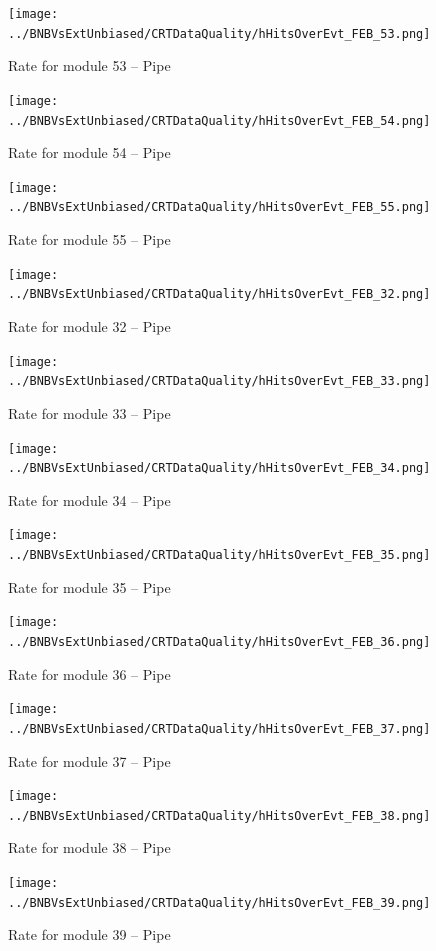 \begin{figure}[h!]
\centering
\texttt{[image: ../BNBVsExtUnbiased/CRTDataQuality/hHitsOverEvt\_FEB\_53.png]}
\caption{Rate for module 53 -- Pipe}
\label{Annual53}
\end{figure}
\begin{figure}[h!]
\centering
\texttt{[image: ../BNBVsExtUnbiased/CRTDataQuality/hHitsOverEvt\_FEB\_54.png]}
\caption{Rate for module 54 -- Pipe}
\label{Annual54}
\end{figure}
\begin{figure}[h!]
\centering
\texttt{[image: ../BNBVsExtUnbiased/CRTDataQuality/hHitsOverEvt\_FEB\_55.png]}
\caption{Rate for module 55 -- Pipe}
\label{Annual55}
\end{figure}
\begin{figure}[h!]
\centering
\texttt{[image: ../BNBVsExtUnbiased/CRTDataQuality/hHitsOverEvt\_FEB\_32.png]}
\caption{Rate for module 32 -- Pipe}
\label{Annual32}
\end{figure}
\begin{figure}[h!]
\centering
\texttt{[image: ../BNBVsExtUnbiased/CRTDataQuality/hHitsOverEvt\_FEB\_33.png]}
\caption{Rate for module 33 -- Pipe}
\label{Annual33}
\end{figure}
\begin{figure}[h!]
\centering
\texttt{[image: ../BNBVsExtUnbiased/CRTDataQuality/hHitsOverEvt\_FEB\_34.png]}
\caption{Rate for module 34 -- Pipe}
\label{Annual34}
\end{figure}
\begin{figure}[h!]
\centering
\texttt{[image: ../BNBVsExtUnbiased/CRTDataQuality/hHitsOverEvt\_FEB\_35.png]}
\caption{Rate for module 35 -- Pipe}
\label{Annual35}
\end{figure}
\begin{figure}[h!]
\centering
\texttt{[image: ../BNBVsExtUnbiased/CRTDataQuality/hHitsOverEvt\_FEB\_36.png]}
\caption{Rate for module 36 -- Pipe}
\label{Annual36}
\end{figure}
\begin{figure}[h!]
\centering
\texttt{[image: ../BNBVsExtUnbiased/CRTDataQuality/hHitsOverEvt\_FEB\_37.png]}
\caption{Rate for module 37 -- Pipe}
\label{Annual37}
\end{figure}
\begin{figure}[h!]
\centering
\texttt{[image: ../BNBVsExtUnbiased/CRTDataQuality/hHitsOverEvt\_FEB\_38.png]}
\caption{Rate for module 38 -- Pipe}
\label{Annual38}
\end{figure}
\begin{figure}[h!]
\centering
\texttt{[image: ../BNBVsExtUnbiased/CRTDataQuality/hHitsOverEvt\_FEB\_39.png]}
\caption{Rate for module 39 -- Pipe}
\label{Annual39}
\end{figure}
